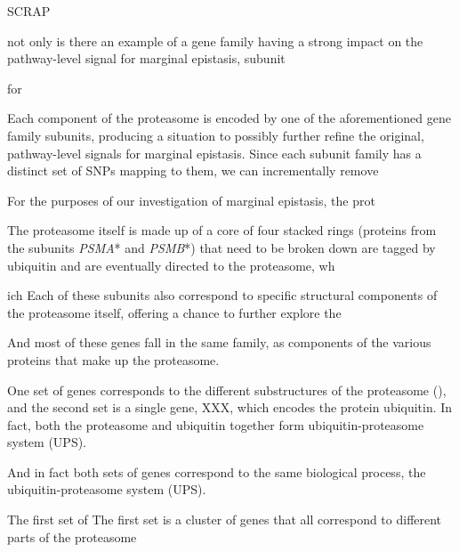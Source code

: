 \documentclass[12pt,a4paper]{article}
\begin{document}
\nolinenumbers

\begingroup


\endgroup














\iffalse

SCRAP








not only is there an example of a gene family having a strong impact on the pathway-level signal for marginal epistasis, subunit  

for 






Each component of the proteasome is encoded by one of the aforementioned gene family subunits, producing a situation to possibly further refine the original, pathway-level signals for marginal epistasis. Since each subunit family has a distinct set of SNPs mapping to them, we can incrementally remove 

For the purposes of our investigation of marginal epistasis, the prot


The proteasome itself is made up of a core of four stacked rings (proteins from the subunits \textit{PSMA}* and \textit{PSMB}*) that need to be broken down are tagged by ubiquitin and are eventually directed to the proteasome, wh

ich  Each of these subunits also correspond to specific structural components of the proteasome itself, offering a chance to further explore the 


And most of these genes fall in the same family, as components of the various proteins that make up the proteasome. 

One set of genes corresponds to the different substructures of the proteasome (), and the second set is a single gene, XXX, which encodes the protein ubiquitin. In fact, both the proteasome and ubiquitin together form ubiquitin-proteasome system (UPS).



And in fact both sets of genes correspond to the same biological process, the ubiquitin-proteasome system (UPS).

The first set of The first set is a cluster of genes that all correspond to different parts of the proteasome
\end{document}
